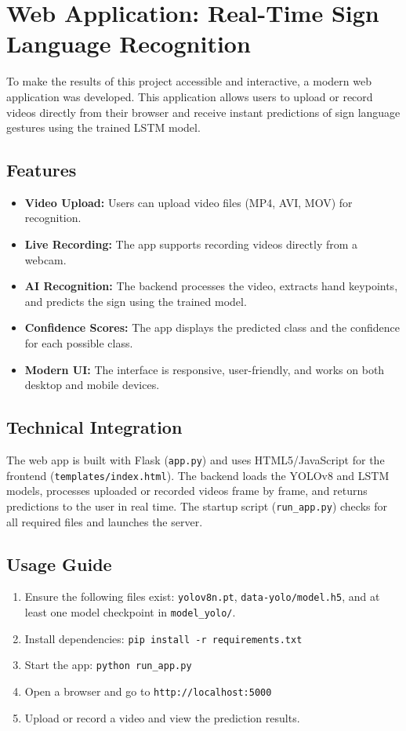 \documentclass[11pt, a4paper]{article}
\begin{document}


\section{Web Application: Real-Time Sign Language Recognition}
To make the results of this project accessible and interactive, a modern web application was developed. This application allows users to upload or record videos directly from their browser and receive instant predictions of sign language gestures using the trained LSTM model.

\subsection{Features}
\begin{itemize}
    \item \textbf{Video Upload:} Users can upload video files (MP4, AVI, MOV) for recognition.
    \item \textbf{Live Recording:} The app supports recording videos directly from a webcam.
    \item \textbf{AI Recognition:} The backend processes the video, extracts hand keypoints, and predicts the sign using the trained model.
    \item \textbf{Confidence Scores:} The app displays the predicted class and the confidence for each possible class.
    \item \textbf{Modern UI:} The interface is responsive, user-friendly, and works on both desktop and mobile devices.
\end{itemize}

\subsection{Technical Integration}
The web app is built with Flask (\texttt{app.py}) and uses HTML5/JavaScript for the frontend (\texttt{templates/index.html}). The backend loads the YOLOv8 and LSTM models, processes uploaded or recorded videos frame by frame, and returns predictions to the user in real time. The startup script (\texttt{run_app.py}) checks for all required files and launches the server.

\subsection{Usage Guide}
\begin{enumerate}
    \item Ensure the following files exist: \texttt{yolov8n.pt}, \texttt{data-yolo/model.h5}, and at least one model checkpoint in \texttt{model\_yolo/}.
    \item Install dependencies: \texttt{pip install -r requirements.txt}
    \item Start the app: \texttt{python run\_app.py}
    \item Open a browser and go to \texttt{http://localhost:5000}
    \item Upload or record a video and view the prediction results.
\end{enumerate}
\end{document}
